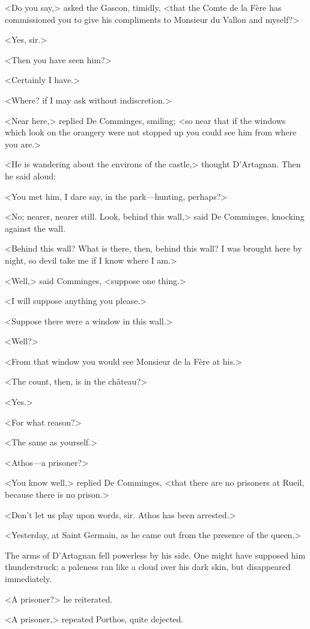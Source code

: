 <Do you say,> asked the Gascon, timidly, <that the Comte de la Fère has commissioned you to give his compliments to Monsieur du Vallon and myself?>

<Yes, sir.>

<Then you have seen him?>

<Certainly I have.>

<Where? if I may ask without indiscretion.>

<Near here,> replied De Comminges, smiling; <so near that if the windows which look on the orangery were not stopped up you could see him from where you are.>

<He is wandering about the environs of the castle,> thought D'Artagnan. Then he said aloud:

<You met him, I dare say, in the park—hunting, perhaps?>

<No; nearer, nearer still. Look, behind this wall,> said De Comminges, knocking against the wall.

<Behind this wall? What is there, then, behind this wall? I was brought here by night, so devil take me if I know where I am.>

<Well,> said Comminges, <suppose one thing.>

<I will suppose anything you please.>

<Suppose there were a window in this wall.>

<Well?>

<From that window you would see Monsieur de la Fère at his.>

<The count, then, is in the château?>

<Yes.>

<For what reason?>

<The same as yourself.>

<Athos—a prisoner?>

<You know well,> replied De Comminges, <that there are no prisoners at Rueil, because there is no prison.>

<Don't let us play upon words, sir. Athos has been arrested.>

<Yesterday, at Saint Germain, as he came out from the presence of the queen.>

The arms of D'Artagnan fell powerless by his side. One might have supposed him thunderstruck; a paleness ran like a cloud over his dark skin, but disappeared immediately.

<A prisoner?> he reiterated.

<A prisoner,> repeated Porthos, quite dejected.

